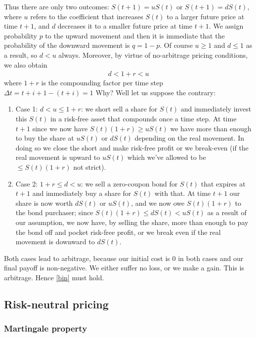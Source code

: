 \documentclass[9pt]{extarticle}
\begin{document}
Thus there are only two outcomes: $S(t+1) = uS(t)$ or $S(t+1)= dS(t)$, where $u$ refers to the 
coefficient that increases $S(t)$ to a larger future price at time $t+1$, and $d$ decreases 
it to a smaller future price at time $t+1$. We assign probability $p$ to the upward movement and then it is immediate 
that the probability of the downward movement is $q=1-p$. Of course $u\geq 1$ and $d\leq 1$ as a result, so 
$d< u$ always.
Moreover, by virtue of no-arbitrage pricing conditions, we also obtain 
\begin{align}\label{bin}
  d < 1 + r < u
\end{align}
where $1+r$ is the compounding factor per time step $\Delta t = t+i+1 - (t+i) = 1$
Why? Well let us suppose the contrary:
\begin{enumerate}
  \item Case 1: $d < u \leq 1+ r$: we short sell a share for $S(t)$ and immediately invest this $S(t)$ in a risk-free 
  asset that compounds once a time step. At time $t+1$ since we now have $S(t)(1+r) \geq uS(t)$ we have more than enough 
  to buy the share at $uS(t)$ or $dS(t)$ depending on the real movement. In doing so we close the short and make risk-free 
  profit or we break-even (if the real movement is upward to $uS(t)$ which we've allowed to be $\leq S(t)(1+r)$ not strict).
  \item Case 2: $1+ r \leq d < u$: we sell a zero-coupon bond for $S(t)$ that expires at $t+1$ and immediately buy a share for $S(t)$ with that. 
  At time $t+1$ our share is now worth $dS(t)$ or $uS(t)$, and we now owe $S(t)(1+r)$ to the bond purchaser; since $S(t)(1+r) \leq dS(t)<uS(t)$ 
  as a result of our assumption, we now have, by selling the share, more than enough to pay the bond off and pocket 
  risk-free profit, or we break even if the real movement is downward to $dS(t)$. 
\end{enumerate}
Both cases lead to arbitrage, because our initial cost is 0 in both cases and our final payoff is non-negative. We either suffer no loss, or 
we make a gain. This is arbitrage. Hence \eqref{bin} must hold. 


\subsection{Risk-neutral pricing}

\subsubsection{Martingale property}
\end{document}
